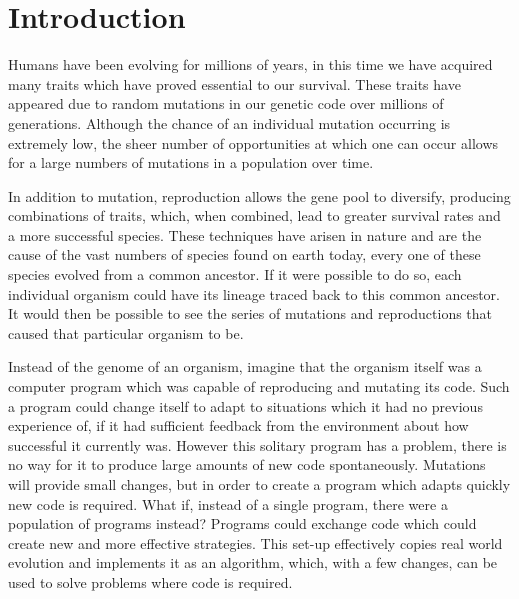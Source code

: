 \documentclass[a4paper, 12pt]{article}
\begin{document}




%




\section{Introduction}
Humans have been evolving for millions of years, in this time we have acquired many traits which have proved essential to our survival. These traits have appeared due to random mutations in our genetic code over millions of generations. Although the chance of an individual mutation occurring is extremely low, the sheer number of opportunities at which one can occur allows for a large numbers of mutations in a population over time. 

In addition to mutation, reproduction allows the gene pool to diversify, producing combinations of traits, which, when combined, lead to greater survival rates and a more successful species. These techniques have arisen in nature and are the cause of the vast numbers of species found on earth today, every one of these species evolved from a common ancestor. If it were possible to do so, each individual organism could have its lineage traced back to this common ancestor. It would then be possible to see the series of mutations and reproductions that caused that particular organism to be. 

Instead of the genome of an organism, imagine that the organism itself was a computer program which was capable of reproducing and mutating its code. Such a program could change itself to adapt to situations which it had no previous experience of, if it had sufficient feedback from the environment about how successful it currently was. However this solitary program has a problem, there is no way for it to produce large amounts of new code spontaneously. Mutations will provide small changes, but in order to create a program which adapts quickly new code is required. What if, instead of a single program, there were a population of programs instead? Programs could exchange code which could create new and more effective strategies. This set-up effectively copies real world evolution and implements it as an algorithm, which, with a few changes, can be used to solve problems where code is required.
\end{document}

